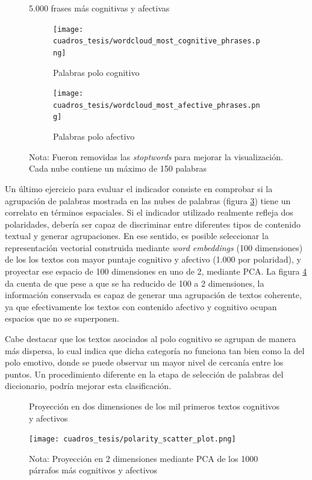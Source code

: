\documentclass[
  12pt,
]{article}
\begin{document}
\begin{figure}[H]
     \caption{5.000 frases más cognitivas y afectivas}
     \centering
     \begin{subfigure}[b]{0.4\textwidth}
         \centering
         \texttt{[image: cuadros\_tesis/wordcloud\_most\_cognitive\_phrases.png]}
         \caption{Palabras polo cognitivo}
         \label{fig:cognitive_5000}
     \end{subfigure}
     \begin{subfigure}[b]{0.4\textwidth}
         \centering
         \texttt{[image: cuadros\_tesis/wordcloud\_most\_afective\_phrases.png]}
         \caption{Palabras polo afectivo}
         \label{fig:affective_5000}
     \end{subfigure}
     \label{fig:1000_phrases}
     \caption*{\footnotesize{{Nota: Fueron removidas las \textit{stoptwords} para mejorar la visualización. Cada nube contiene un máximo de 150 palabras} }}
\end{figure}

Un último ejercicio para evaluar el indicador consiste en comprobar si
la agrupación de palabras mostrada en las nubes de palabras (figura
\ref{fig:1000_phrases}) tiene un correlato en términos espaciales. Si el
indicador utilizado realmente refleja dos polaridades, debería ser capaz
de discriminar entre diferentes tipos de contenido textual y generar
agrupaciones. En ese sentido, es posible seleccionar la representación
vectorial construida mediante \emph{word embeddings} (100 dimensiones)
de los los textos con mayor puntaje cognitivo y afectivo (1.000 por
polaridad), y proyectar ese espacio de 100 dimensiones en uno de 2,
mediante PCA. La figura \ref{scatter_embedding} da cuenta de que pese a
que se ha reducido de 100 a 2 dimensiones, la información conservada es
capaz de generar una agrupación de textos coherente, ya que
efectivamente los textos con contenido afectivo y cognitivo ocupan
espacios que no se superponen.

Cabe destacar que los textos asociados al polo cognitivo se agrupan de
manera más dispersa, lo cual indica que dicha categoría no funciona tan
bien como la del polo emotivo, donde se puede observar un mayor nivel de
cercanía entre los puntos. Un procedimiento diferente en la etapa de
selección de palabras del diccionario, podría mejorar esta
clasificación.

\begin{figure}[H]
\centering
\large
\caption{Proyección en dos dimensiones de los mil primeros textos cognitivos y afectivos}
\label{scatter_embedding}
\texttt{[image: cuadros\_tesis/polarity\_scatter\_plot.png]}
     \caption*{\footnotesize{{Nota: Proyección en 2 dimensiones mediante PCA de los 1000 párrafos más cognitivos y afectivos } }}
\normalsize
\end{figure}
\end{document}
